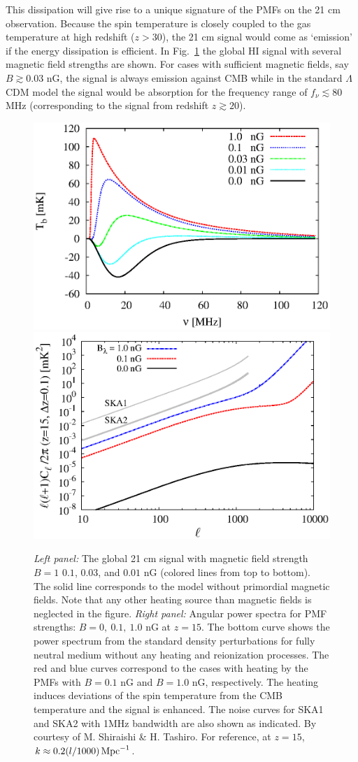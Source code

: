 \documentclass{PoS}
\begin{document}
This dissipation will give rise to a unique signature of the PMFs on the
21 cm observation. Because the spin temperature is closely coupled to
the gas temperature at high redshift ($z>30$), the 21 cm signal would
come as `emission' if the energy dissipation is efficient. In
Fig.~\ref{fig:KI1} the global HI signal with several magnetic field
strengths are shown. For cases with sufficient magnetic fields, say
$B\gtrsim 0.03$ nG, the signal is always emission against CMB while in
the standard $\Lambda$CDM model the signal would be absorption for the
frequency range of $f_\nu \lesssim 80$ MHz (corresponding to the signal
from redshift $z\gtrsim 20$).
\begin{figure}[]
\includegraphics[width=0.5\linewidth,angle=0]{figures/KI_fig1.eps}
\includegraphics[width=0.5\linewidth,angle=0]{figures/KI_fig2.eps}
\caption{{\em Left panel: }The global 21 cm signal with magnetic field strength $B=1$
$0.1$, $0.03$, and $0.01$ nG (colored lines from top to bottom). The
solid line corresponds to the model without primordial magnetic fields.
Note that any other heating source than magnetic fields is neglected in
the figure. {\em Right panel: }Angular power spectra for PMF strengths: $B=0,~ 0.1,~ 1.0$ nG
at $z=15$. The bottom curve shows the power spectrum from the standard
density perturbations for fully neutral medium without any heating and
reionization processes. The red and blue curves correspond to the cases
with heating by the PMFs with $B=0.1$ nG and $B=1.0$ nG,
respectively. The heating induces deviations of the spin temperature
from the CMB temperature and the signal is enhanced. The noise curves
for SKA1 and SKA2 with 1MHz bandwidth are also shown as indicated. By courtesy of
M. Shiraishi \& H. Tashiro. For reference, at $z=15$, $k\approx0.2(l/1000){\rm\,Mpc}^{-1}$.}  \label{fig:KI1}
\end{figure}
\end{document}
